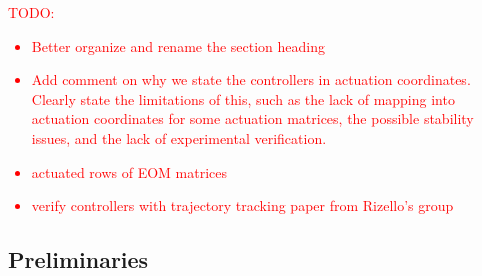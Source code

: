 \textcolor{red}{TODO: \begin{itemize}
    \item Better organize and rename the section heading
    \item Add comment on why we state the controllers in actuation coordinates. Clearly state the limitations of this, such as the lack of mapping into actuation coordinates for some actuation matrices, the possible stability issues, and the lack of experimental verification.
    \item actuated rows of EOM matrices
    \item verify controllers with trajectory tracking paper from Rizello's group
\end{itemize}}

\subsection{Preliminaries}

